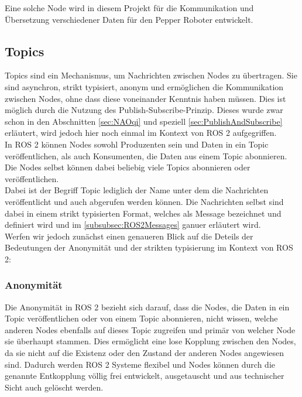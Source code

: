 \noindent
Eine solche Node wird in diesem Projekt für die Kommunikation und Übersetzung verschiedener Daten für den Pepper Roboter entwickelt.\\

\subsection{Topics}\label{subsec:ROS2Topics}
Topics sind ein Mechanismus, um Nachrichten zwischen Nodes zu übertragen. Sie sind asynchron, strikt typisiert, anonym und ermöglichen die Kommunikation zwischen Nodes, ohne dass diese voneinander Kenntnis haben müssen. Dies ist möglich durch die Nutzung des Publish-Subscribe-Prinzip. Dieses wurde zwar schon in den Abschnitten \autoref{sec:NAOqi} und speziell \autoref{sec:PublishAndSubscribe} erläutert, wird jedoch hier noch einmal im Kontext von \ac{ROS} 2 aufgegriffen.
\\

\noindent
In \ac{ROS} 2 können Nodes sowohl Produzenten sein und Daten in ein Topic veröffentlichen, als auch Konsumenten, die Daten aus einem Topic abonnieren. Die Nodes selbst können dabei beliebig viele Topics abonnieren oder veröffentlichen.
\\

\noindent
Dabei ist der Begriff Topic lediglich der Name unter dem die Nachrichten veröffentlicht und auch abgerufen werden können. Die Nachrichten selbst sind dabei in einem strikt typisierten Format, welches als Message bezeichnet und definiert wird und im \autoref{subsubsec:ROS2Messages} ganuer erläutert wird.
\\

\noindent
Werfen wir jedoch zunächst einen genaueren Blick auf die Deteils der Bedeutungen der Anonymität und der strikten typisierung im Kontext von \ac{ROS} 2:\\

\subsubsection{Anonymität}\label{subsubsec:ROS2Anonymitaet}
Die Anonymität in \ac{ROS} 2 bezieht sich darauf, dass die Nodes, die Daten in ein Topic veröffentlichen oder von einem Topic abonnieren, nicht wissen, welche anderen Nodes ebenfalls auf dieses Topic zugreifen und primär von welcher Node sie überhaupt stammen. Dies ermöglicht eine lose Kopplung zwischen den Nodes, da sie nicht auf die Existenz oder den Zustand der anderen Nodes angewiesen sind. Dadurch werden \ac{ROS} 2 Systeme flexibel und Nodes können durch die genannte Entkopplung völlig frei entwickelt, ausgetauscht und aus technischer Sicht auch gelöscht werden.\\

